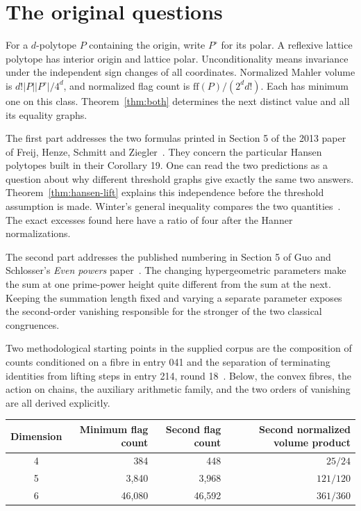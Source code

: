 \documentclass[11pt,a4paper]{article}
\numberwithin{equation}{section}
\begin{document}
\section*{The original questions}
For a $d$-polytope $P$ containing the origin, write $P^\circ$ for its polar. A reflexive lattice polytope has interior origin and lattice polar. Unconditionality means invariance under the independent sign changes of all coordinates. Normalized Mahler volume is $d!|P||P^\circ|/4^d$, and normalized flag count is $\mathrm{ff}(P)/(2^d d!)$. Each has minimum one on this class. Theorem~\ref{thm:both} determines the next distinct value and all its equality graphs.\par\medskip The first part addresses the two formulas printed in Section 5 of the 2013 paper of Freij, Henze, Schmitt and Ziegler~\cite{FHSZ}. They concern the particular Hansen polytopes built in their Corollary 19. One can read the two predictions as a question about why different threshold graphs give exactly the same two answers. Theorem~\ref{thm:hansen-lift} explains this independence before the threshold assumption is made. Winter's general inequality compares the two quantities~\cite{Winter}. The exact excesses found here have a ratio of four after the Hanner normalizations.
 
The second part addresses the published numbering in Section 5 of Guo and Schlosser's \emph{Even powers} paper~\cite{GS}. The changing hypergeometric parameters make the sum at one prime-power height quite different from the sum at the next. Keeping the summation length fixed and varying a separate parameter exposes the second-order vanishing responsible for the stronger of the two classical congruences.

Two methodological starting points in the supplied corpus are the composition of counts conditioned on a fibre in entry 041 and the separation of terminating identities from lifting steps in entry 214, round 18~\cite{Corpus}. Below, the convex fibres, the action on chains, the auxiliary arithmetic family, and the two orders of vanishing are all derived explicitly.

\begin{center}\small
\begin{tabular}{c@{\quad}r@{\quad}r@{\quad}r}
\toprule
Dimension & Minimum flag count & Second flag count & Second normalized volume product\\
\midrule
4 & 384 & 448 & $25/24$\\
5 & 3,840 & 3,968 & $121/120$\\
6 & 46,080 & 46,592 & $361/360$\\
\bottomrule
\end{tabular}
\end{center}
\clearpage
\end{document}
